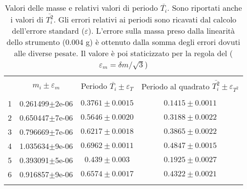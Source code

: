 \begin{table}[t]
    \centering
    \small
    \caption{Valori delle masse e relativi valori di periodo $\bar{T_i}$. Sono riportati anche i valori di
    $\bar{T_i^2}$. Gli errori relativi ai periodi sono ricavati dal calcolo dell'errore standard ($\varepsilon$). 
    L'errore sulla massa preso dalla linearità dello strumento (0.004 g) è ottenuto dalla somma degli errori dovuti 
    alle diverse pesate. Il valore è poi staticizzato per la regola del \treSigma ($\varepsilon_m = \delta m/\sqrt{3}$)}
    \label{table:dyn_values}
    \begin{tabular}{lccc}
        \hline\hline\\[-1.5ex]
          & $m_i\pm\varepsilon_m$ & Periodo $\bar{T_i}\pm\varepsilon_T$ & Periodo al quadrato $\bar{T_i^2}\pm\varepsilon_{T^2}$ \\[+0.5ex] \hline \\[-1.5ex]
        1 & 0.261499$\pm$2e-06    & $0.3761\pm0.0015$                   & $0.1415\pm0.0011$                                     \\[+0.5ex]
        2 & 0.650447$\pm$7e-06    & $0.5646\pm0.0020$                   & $0.3188\pm0.0022$                                     \\[+0.5ex]
        3 & 0.796669$\pm$7e-06    & $0.6217\pm0.0018$                   & $0.3865\pm0.0022$                                     \\[+0.5ex]
        4 & 1.035634$\pm$9e-06    & $0.6962\pm0.0011$                   & $0.4847\pm0.0015$                                     \\[+0.5ex]
        5 & 0.393091$\pm$5e-06    & $0.439 \pm0.003 $                   & $0.1925\pm0.0027$                                     \\[+0.5ex]
        6 & 0.916857$\pm$9e-06    & $0.6574\pm0.0017$                   & $0.4322\pm0.0021$                                     \\[+0.5ex]
        \hline \\[-1.5ex]
        
    \end{tabular}
\end{table}